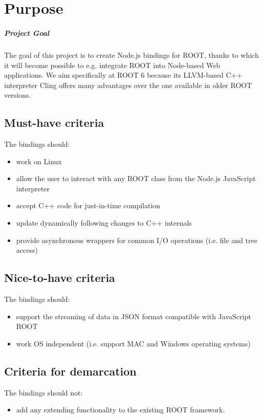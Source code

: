 \chapter{Purpose}
\paragraph{Project Goal}
The goal of this project is to create Node.js bindings for ROOT, thanks to which it will become possible to e.g. integrate ROOT into Node-based Web applications.
We aim specifically at ROOT 6 because its LLVM-based C++ interpreter Cling offers many advantages over the one available in older ROOT versions.
\section{Must-have criteria}
The bindings should:
\begin{itemize}
	\item work on Linux
	\item allow the user to interact with any ROOT class from the Node.js JavaScript interpreter
	\item accept C++ code for just-in-time compilation
	\item update dynamically following changes to C++ internals
	\item provide asynchronous wrappers for common I/O operations (i.e. file and tree access)
\end{itemize}
\section{Nice-to-have criteria}
The bindings should:
\begin{itemize}
	\item support the streaming of data in JSON format compatible with JavaScript ROOT
	\item work OS independent (i.e. support MAC and Windows operating systems)
\end{itemize}
\section{Criteria for demarcation}
The bindings should not:
\begin{itemize}
	\item add any extending functionality to the existing ROOT framework.
\end{itemize}
